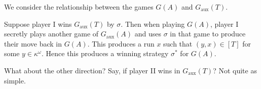 \documentclass[]{article}
\newcommand{\om}{\omega}
\newcommand{\aux}{\textrm{aux}}
\begin{document}
We consider the relationship between the games $G(A)$ and $G_\aux(T)$.

Suppose player I wins $G_\aux(T)$ by $\sigma$. Then when playing $G(A)$, player I secretly plays another game of $G_\aux(A)$ and uses $\sigma$ in that game to produce their move back in $G(A)$. This produces a run $x$ such that $(y,x) \in [T]$ for some $y\in \kappa^\om$. Hence this produces a winning strategy $\sigma^\ast$ for $G(A)$.

What about the other direction? Say, if player II wins in $G_\aux(T)$? Not quite as simple.
\end{document}
